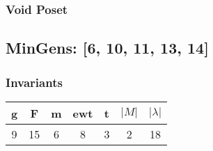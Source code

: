 \documentclass[a4paper]{article}
\begin{document}
\hfill\begin{minipage}{0.48\textwidth}
\subsubsection*{Void Poset}
\centering
{}
\end{minipage}
\newpage\subsection{MinGens: [6, 10, 11, 13, 14]}
\noindent\begin{minipage}{0.6\textwidth}
\subsubsection*{Invariants}
\centering
\begin{tabular}{|c|c|c|c|c|c|c|}
\toprule
g & F & m & ewt & t & \(|M|\) & \(|\lambda|\) \\
\midrule
9 & 15 & 6 & 8 & 3 & 2 & 18 \\
\bottomrule
\end{tabular}
\end{minipage}%
\end{document}
